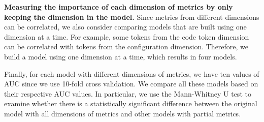 
\noindent\textbf{Measuring the importance of each dimension of metrics by only keeping the dimension in the model.} 
Since metrics from different dimensions can be correlated, we also consider comparing models that are built using one dimension at a time. %
For example, some tokens from the code token dimension can be correlated with tokens from the configuration dimension. Therefore, we build a model using one dimension at a time, which results in four models. 

Finally, for each model with different dimensions of metrics, we have ten values of AUC since we use 10-fold cross validation. We compare all these models based on their respective AUC values.  In particular, we use the  Mann-Whitney U test to examine whether there is a statistically significant difference between the original model with all dimensions of metrics and other models with partial metrics. %

